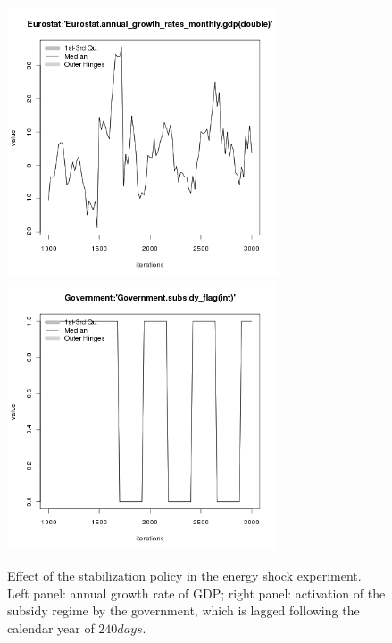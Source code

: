 \begin{figure}[ht!]
\centering\leavevmode
\begin{minipage}{17cm}
\centering\leavevmode
\includegraphics[width=8cm]{./stabilization/png/Eurostat-annual_growth_rates_monthly-gdp.png}
\includegraphics[width=8cm]{./stabilization/png/Government-subsidy_flag.png}
\end{minipage}
\caption{Effect of the stabilization policy in the energy shock experiment. Left panel: annual growth rate of GDP; right panel: activation of the subsidy regime by the government, which is lagged following the calendar year of $240 days$.}
\label{Figure: Stabilization}
\end{figure}
